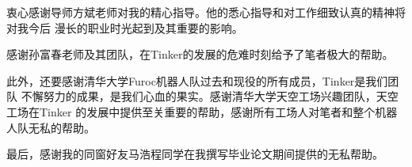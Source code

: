 
\begin{acknowledgements}
  衷心感谢导师方斌老师对我的精心指导。他的悉心指导和对工作细致认真的精神将对我今后
  漫长的职业时光起到及其重要的影响。
  
  感谢孙富春老师及其团队，在Tinker的发展的危难时刻给予了笔者极大的帮助。
  
  此外，还要感谢清华大学Furoc机器人队过去和现役的所有成员，Tinker是我们团队
  不懈努力的成果，是我们心血的果实。感谢清华大学天空工场兴趣团队，天空工场在Tinker
  的发展中提供至关重要的帮助，感谢所有工场人对笔者和整个机器人队无私的帮助。
  
  最后，感谢我的同窗好友马浩程同学在我撰写毕业论文期间提供的无私帮助。

\end{acknowledgements}
